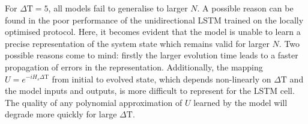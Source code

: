 For $\Delta \mathrm{T} = 5$, all models fail to generalise to larger $N$.
A possible reason can be found in the poor performance of the unidirectional LSTM trained on the locally optimised protocol.
Here, it becomes evident that the model is unable to learn a precise representation of the system state which remains valid for larger $N$.
Two possible reasons come to mind: firstly the larger evolution time leads to a faster propagation of errors in the representation.
Additionally, the mapping $U = e^{-i H_s \Delta \mathrm{T}}$ from initial to evolved state, which depends non-linearly on $\Delta \mathrm{T}$ and the model inputs and outputs, is more difficult to represent for the LSTM cell.
The quality of any polynomial approximation of $U$ learned by the model will degrade more quickly for large $\Delta \mathrm{T}$.